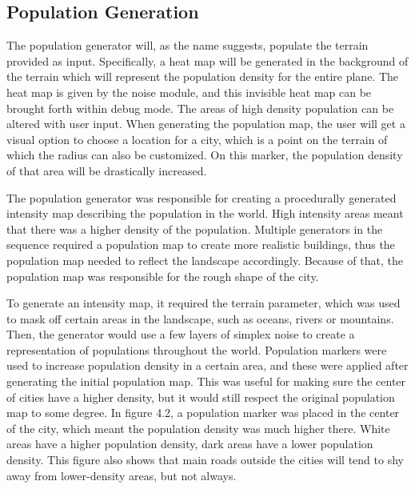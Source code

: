 \subsection{Population Generation}

The population generator will, as the name suggests, populate the terrain provided as input. Specifically, a heat map will be generated in the background of the terrain which will represent the population density for the entire plane.
The heat map is given by the noise module, and this invisible heat map can be brought forth within debug mode.
The areas of high density population can be altered with user input.
When generating the population map, the user will get a visual option to choose a location for a city, which is a point on the terrain of which the radius can also be customized.
On this marker, the population density of that area will be drastically increased.

The population generator was responsible for creating a procedurally generated intensity map describing the population in the world.
High intensity areas meant that there was a higher density of the population.
Multiple generators in the sequence required a population map to create more realistic buildings, thus the population map needed to reflect the landscape accordingly.
Because of that, the population map was responsible for the rough shape of the city.

To generate an intensity map, it required the terrain parameter, which was used to mask off certain areas in the landscape, such as oceans, rivers or mountains.
Then, the generator would use a few layers of simplex noise to create a representation of populations throughout the world.
Population markers were used to increase population density in a certain area, and these were applied after generating the initial population map.
This was useful for making sure the center of cities have a higher density, but it would still respect the original population map to some degree.
In figure 4.2, a population marker was placed in the center of the city, which meant the population density was much higher there.
White areas have a higher population density, dark areas have a lower population density. This figure also shows that main roads outside the cities will tend to shy away from lower-density areas, but not always.

